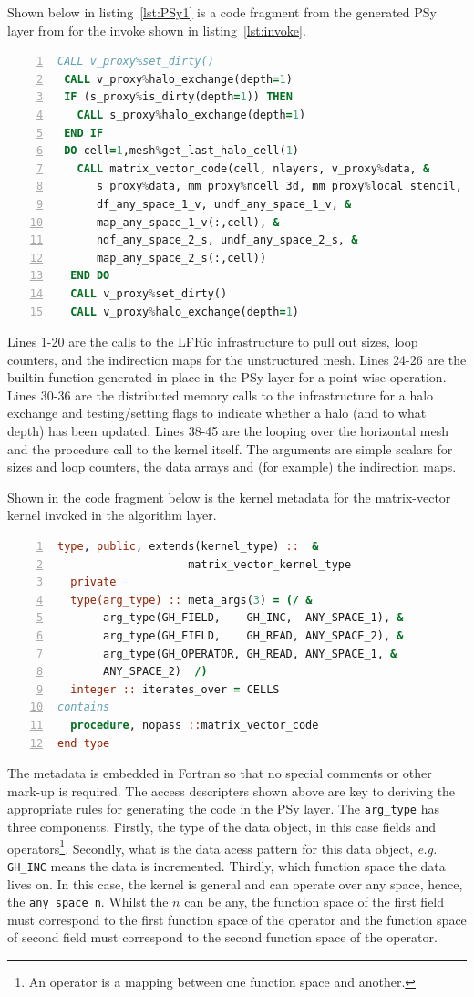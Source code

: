 \documentclass[review,times]{elsarticle}
\begin{document}
Shown below in listing~\ref{lst:PSy1} is a code fragment from the generated PSy layer from for
the invoke shown in listing~\ref{lst:invoke}.
\begin{lstlisting}[language=Fortran, numbers=left,caption={Code 
fragment of the generated PSy layer},label={lst:PSy1}]
 CALL v_proxy%set_dirty()
 CALL v_proxy%halo_exchange(depth=1)
 IF (s_proxy%is_dirty(depth=1)) THEN
   CALL s_proxy%halo_exchange(depth=1)
 END IF 
 DO cell=1,mesh%get_last_halo_cell(1)
   CALL matrix_vector_code(cell, nlayers, v_proxy%data, &
      s_proxy%data, mm_proxy%ncell_3d, mm_proxy%local_stencil, &
      df_any_space_1_v, undf_any_space_1_v, &
      map_any_space_1_v(:,cell), &
      ndf_any_space_2_s, undf_any_space_2_s, &
      map_any_space_2_s(:,cell))
  END DO 
  CALL v_proxy%set_dirty()
  CALL v_proxy%halo_exchange(depth=1)
\end{lstlisting}
Lines 1-20 are the calls to the LFRic infrastructure to pull out
sizes, loop counters, and the indirection maps for the unstructured
mesh. Lines 24-26 are the builtin function generated in place in the
PSy layer for a point-wise operation. Lines 30-36 are the distributed
memory calls to the infrastructure for a halo exchange and
testing/setting flags to indicate whether a halo (and to what depth)
has been updated. Lines 38-45 are the looping over the horizontal mesh
and the procedure call to the kernel itself. The arguments are simple
scalars for sizes and loop counters, the data arrays and (for example)
the indirection maps. 


Shown in the code fragment below is the kernel metadata for the
matrix-vector kernel invoked in the algorithm layer.
\begin{lstlisting}[language=Fortran, numbers=left,caption={Code
fragment showing kernel metadata for the matrix-vector operator kernel},label={lst:metadata}]
type, public, extends(kernel_type) ::  &
                    matrix_vector_kernel_type
  private
  type(arg_type) :: meta_args(3) = (/ &
       arg_type(GH_FIELD,    GH_INC,  ANY_SPACE_1), &
       arg_type(GH_FIELD,    GH_READ, ANY_SPACE_2), &
       arg_type(GH_OPERATOR, GH_READ, ANY_SPACE_1, &
       ANY_SPACE_2)  /)
  integer :: iterates_over = CELLS
contains
  procedure, nopass ::matrix_vector_code
end type
\end{lstlisting}
The metadata is embedded in Fortran so that no special comments or
other mark-up is required. The access descripters shown above are key
to deriving the appropriate rules for generating the code in the PSy
layer. The \verb+arg_type+ has three components. Firstly, the type of
the data object, in this case fields and operators\footnote{An
  operator is a mapping between one function space and another.}. Secondly, what is
the data acess pattern for this data object, {\em e.g.} \verb+GH_INC+ means the data is
incremented. Thirdly, which function space the data lives on. In this case, the
kernel is general and can operate over any space, hence, the
\verb+any_space_n+. Whilst the $n$ can be any, the function space of the
first field must correspond to the first function space of the operator and the
function space of second field must correspond to the second function
space of the operator. 
\end{document}

